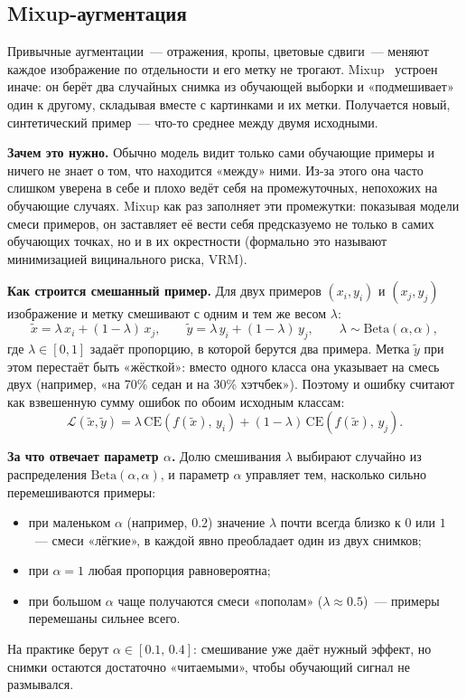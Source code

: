 \documentclass[10pt,a4paper]{report}
\numberwithin{equation}{chapter}
\numberwithin{figure}{chapter}
\numberwithin{table}{chapter}
\begin{document}
\subsection{Mixup-аугментация}

Привычные аугментации~--- отражения, кропы, цветовые сдвиги~--- меняют
каждое изображение по отдельности и его метку не трогают.
Mixup~\cite{zhang2018mixup} устроен иначе: он берёт два случайных снимка
из обучающей выборки и «подмешивает» один к другому, складывая вместе с
картинками и их метки. Получается новый, синтетический пример~--- что-то
среднее между двумя исходными.

\textbf{Зачем это нужно.} Обычно модель видит только сами обучающие
примеры и ничего не знает о том, что находится «между» ними. Из-за этого
она часто слишком уверена в себе и плохо ведёт себя на промежуточных,
непохожих на обучающие случаях. Mixup как раз заполняет эти промежутки:
показывая модели смеси примеров, он заставляет её вести себя предсказуемо
не только в самих обучающих точках, но и в их окрестности (формально это
называют минимизацией вицинального риска, VRM).

\textbf{Как строится смешанный пример.} Для двух примеров $(x_i, y_i)$ и
$(x_j, y_j)$ изображение и метку смешивают с одним и тем же весом
$\lambda$:
\begin{equation}
  \tilde{x} = \lambda\, x_i + (1-\lambda)\, x_j,\qquad
  \tilde{y} = \lambda\, y_i + (1-\lambda)\, y_j,\qquad
  \lambda \sim \mathrm{Beta}(\alpha,\alpha),
  \label{eq:mixup_theory}
\end{equation}
где $\lambda \in [0,1]$ задаёт пропорцию, в которой берутся два примера.
Метка $\tilde{y}$ при этом перестаёт быть «жёсткой»: вместо одного класса
она указывает на смесь двух (например, «на 70\% седан и на 30\%
хэтчбек»). Поэтому и ошибку считают как взвешенную сумму ошибок по обоим
исходным классам:
\begin{equation}
  \mathcal{L}(\tilde{x},\tilde{y})
  = \lambda\,\mathrm{CE}(f(\tilde{x}),\,y_i)
  + (1-\lambda)\,\mathrm{CE}(f(\tilde{x}),\,y_j).
  \label{eq:mixup_loss_theory}
\end{equation}

\textbf{За что отвечает параметр $\alpha$.} Долю смешивания $\lambda$
выбирают случайно из распределения $\mathrm{Beta}(\alpha,\alpha)$, и
параметр $\alpha$ управляет тем, насколько сильно перемешиваются примеры:
\begin{itemize}[nosep]
  \item при маленьком $\alpha$ (например, $0.2$) значение $\lambda$ почти
    всегда близко к $0$ или $1$~--- смеси «лёгкие», в каждой явно
    преобладает один из двух снимков;
  \item при $\alpha = 1$ любая пропорция равновероятна;
  \item при большом $\alpha$ чаще получаются смеси «пополам»
    ($\lambda \approx 0.5$)~--- примеры перемешаны сильнее всего.
\end{itemize}
На практике берут $\alpha \in [0.1,\,0.4]$: смешивание уже даёт нужный
эффект, но снимки остаются достаточно «читаемыми», чтобы обучающий
сигнал не размывался.
\end{document}
